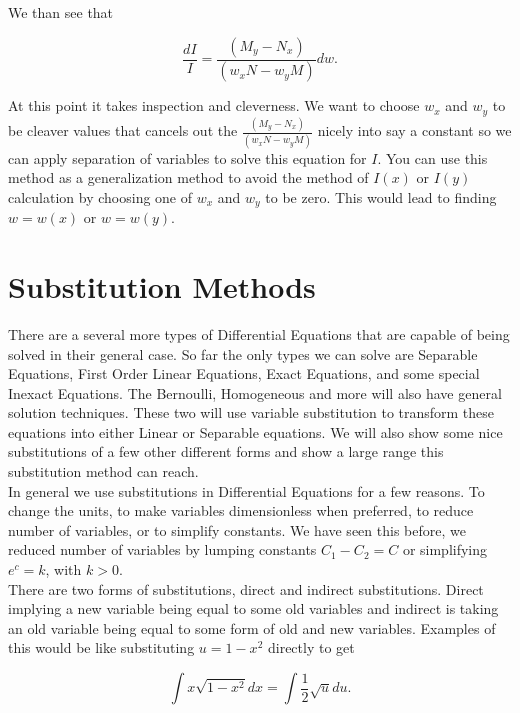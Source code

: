 \documentclass[12pt]{article}
\begin{document}
We than see that 

\begin{equation*}
    \frac{dI}{I} = \frac{(M_y - N_x)}{(w_x N - w_y M)}dw.
\end{equation*}

At this point it takes inspection and cleverness. We want to choose $w_x$ and $w_y$ to be cleaver values that cancels out the $\frac{(M_y - N_x)}{(w_x N - w_y M)}$ nicely into say a constant so we can apply separation of variables to solve this equation for $I$. You can use this method as a generalization method to avoid the method of $I(x)$ or $I(y)$ calculation by choosing one of $w_x$ and $w_y$ to be zero. This would lead to finding $w=w(x)$ or $w=w(y)$. \\


\pagebreak

\section{Substitution Methods}

There are a several more types of Differential Equations that are capable of being solved in their general case. So far the only types we can solve are Separable Equations, First Order Linear Equations, Exact Equations, and some special Inexact Equations. The Bernoulli, Homogeneous and more will also have general solution techniques. These two will use variable substitution to transform these equations into either Linear or Separable equations. We will also show some nice substitutions of a few other different forms and show a large range this substitution method can reach. \\

In general we use substitutions in Differential Equations for a few reasons. To change the units, to make variables dimensionless when preferred, to reduce number of variables, or to simplify constants. We have seen this before, we reduced number of variables by lumping constants $C_1-C_2=C$ or simplifying $e^c=k$, with $k>0$. \\

There are two forms of substitutions, direct and indirect substitutions. Direct implying a new variable being equal to some old variables and indirect is taking an old variable being equal to some form of old and new variables. Examples of this would be like substituting $u=1-x^2$ directly to get

\begin{equation*}
    \int x \sqrt{1-x^2} dx = \int \frac{1}{2} \sqrt{u} du.
\end{equation*}
\end{document}
